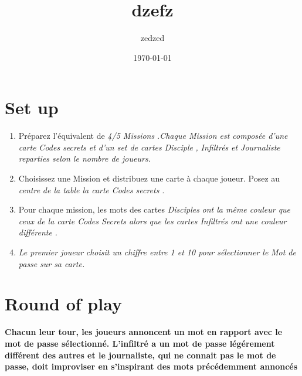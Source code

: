 \documentclass{article}%
\title{dzefz}%
\author{zedzed}%
\date{\today}%
\begin{document}
%
\pagestyle{empty}%
\normalsize%
\maketitle%
\section{ Set up
}%
\label{sec:Setup}%
\begin{enumerate}%
\item%
%
  Préparez l'équivalent de %
\textit{4/5 Missions}%
\textit{.Chaque Mission est composée d'une carte }%
\textit{Codes secrets}%
\textit{ et d'un set de cartes }%
\textit{Disciple}%
\textit{,}%
\textit{ Infiltrés}%
\textit{ et Journaliste reparties selon le nombre de joueurs.
}%
\item%
%
  Choisissez une Mission et distribuez une carte à chaque joueur. Posez au %
\textit{centre}%
\textit{ de la table la carte }%
\textit{Codes secrets}%
\textit{.
}%
\item%
%
  Pour chaque mission, les mots des cartes %
\textit{Disciples}%
\textit{ ont la même couleur que ceux de la carte Codes Secrets alors que les cartes Infiltrés ont une couleur }%
\textit{différente}%
\textit{.
}%
\item%
%
\textit{Le premier joueur}%
\textit{ choisit un chiffre entre 1 et 10 pour sélectionner le }%
\textit{Mot de passe}%
\textit{ sur sa carte.
}%
\end{enumerate}

%
\section{ Round of play
}%
\label{sec:Roundofplay}%
\textbf{Chacun leur tour, les joueurs annoncent un mot en rapport avec le mot de passe sélectionné. L'infiltré a un mot de passe légérement différent des autres et le journaliste, qui ne connait pas le mot de passe, doit improviser en s'inspirant des mots précédemment annoncés}

%
\end{document}

